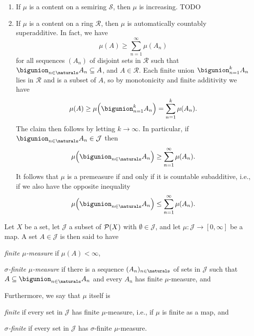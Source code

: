 \documentclass[article, a4paper, 11pt, oneside]{memoir}
\numberwithin{equation}{chapter}
\newcommand{\calR}{\mathcal{R}}
\newcommand{\calS}{\mathcal{S}}
\newcommand{\calJ}{\mathcal{J}}
\begin{document}
\begin{remarkbreak}
\begin{enumerate}
    \item If $\mu$ is a content on a semiring $\calS$, then $\mu$ is increasing. TODO

    \item If $\mu$ is a content on a ring $\calR$, then $\mu$ is automatically countably superadditive. In fact, we have
    \begin{equation*}
        \mu(A)
            \geq \sum_{n=1}^\infty \mu(A_n)
    \end{equation*}
    for all sequences $(A_n)$ of disjoint sets in $\calR$ such that $\bigunion_{n \in \naturals} A_n \subseteq A$, and $A \in \calR$. Each finite union $\bigunion_{n=1}^k A_n$ lies in $\calR$ and is a subset of $A$, so by monotonicity and finite additivity we have
    \begin{equation*}
        \mu(A)
            \geq \mu \Bigl( \bigunion_{n=1}^k A_n \Bigr)
            = \sum_{n=1}^k \mu(A_n).
    \end{equation*}
    The claim then follows by letting $k \to \infty$. In particular, if $\bigunion_{n \in \naturals} A_n \in \calJ$ then
    \begin{equation*}
        \mu \Bigl( \bigunion_{n \in \naturals} A_n \Bigr)
            \geq \sum_{n=1}^\infty \mu(A_n).
    \end{equation*}
    It follows that $\mu$ is a premeasure if and only if it is countable subadditive, i.e., if we also have the opposite inequality
    \begin{equation*}
        \mu \Bigl( \bigunion_{n \in \naturals} A_n \Bigr)
            \leq \sum_{n=1}^\infty \mu(A_n).
    \end{equation*}
\end{enumerate}
\end{remarkbreak}


\begin{definition}
    Let $X$ be a set, let $\calJ$ a subset of $\mathcal{P}(X)$ with $\emptyset \in \calJ$, and let $\mu \colon \calJ \to [0,\infty]$ be a map. A set $A \in \calJ$ is then said to have
    \begin{enumdef}
        \item \emph{finite $\mu$-measure} if $\mu(A) < \infty$,
        
        \item \emph{$\sigma$-finite $\mu$-measure} if there is a sequence $(A_n)_{n \in \naturals}$ of sets in $\calJ$ such that $A \subseteq \bigunion_{n \in \naturals} A_n$ and every $A_n$ has finite $\mu$-measure, and
    \end{enumdef}
    Furthermore, we say that $\mu$ itself is
    \begin{enumdef}
        \item \emph{finite} if every set in $\calJ$ has finite $\mu$-measure, i.e., if $\mu$ is finite as a map, and
        \item \emph{$\sigma$-finite} if every set in $\calJ$ has $\sigma$-finite $\mu$-measure.
    \end{enumdef}
\end{definition}
\end{document}
